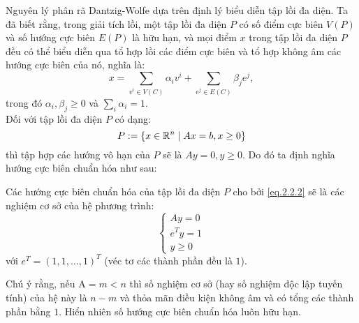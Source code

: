 Nguyên lý phân rã Dantzig-Wolfe dựa trên định lý biểu diễn tập lồi đa diện. Ta đã biết rằng, trong giải tích lồi, một tập lồi đa diện $P$ có số điểm cực biên $V(P)$ và số hướng cực biên $E(P)$ là hữu hạn, và mọi điểm $x$ trong tập lồi đa diện $P$ đều có thể biểu diễn qua tổ hợp lồi các điểm cực biên và tổ hợp không âm các hướng cực biên của nó, nghĩa là:
\begin{equation}\label{eq.2.2.1}
x = \sum_{v^i\in V(C)}\alpha_iv^i + \sum_{e^j\in E(C)}\beta_je^j,
\end{equation}
trong đó $\alpha_i, \beta_j\geq 0$ và $\sum_{i}\alpha_i = 1$.\\
Đối với tập lồi đa diện $P$ có dạng:
\begin{equation}\label{eq.2.2.2}
P :=\{x\in {\mathbb R}^n\;|\; Ax=b, x\geq 0\}
\end{equation}
thì tập hợp các hướng vô hạn của $P$ sẽ là $Ay=0, y\geq 0$. Do đó ta định nghĩa hướng cực biên chuẩn hóa như sau:
\begin{definition}
Các hướng cực biên chuẩn hóa của tập lồi đa diện $P$ cho bởi \eqref{eq.2.2.2} sẽ là các nghiệm cơ sở của hệ phương trình:
\begin{equation}\label{eq.2.2.3}
\left\{ \begin{array}{l}
Ay = 0\\
e^Ty = 1\\
y \geq 0
\end{array} \right .
\end{equation}
với $e^T = (1, 1,\ldots, 1)^T$ (véc tơ các thành phần đều là $1$).
\end{definition}
Chú ý rằng, nếu $\text{A}=m<n$ thì số nghiệm cơ sở (hay số nghiệm độc lập tuyến tính) của hệ này là $n-m$ và thỏa mãn điều kiện không âm và có tổng các thành phần bằng $1$.
Hiển nhiên số hướng cực biên chuẩn hóa luôn hữu hạn.

